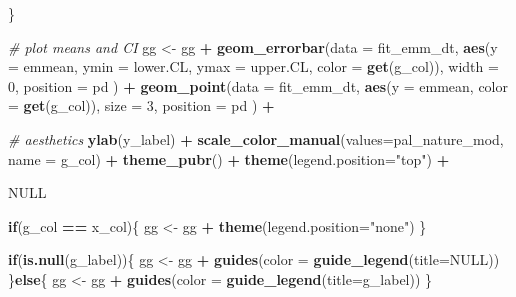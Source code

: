 \documentclass[]{book}
\newenvironment{Shaded}{\begin{snugshade}}{\end{snugshade}}
\newcommand{\CommentTok}[1]{\textcolor[rgb]{0.56,0.35,0.01}{\textit{#1}}}
\newcommand{\ControlFlowTok}[1]{\textcolor[rgb]{0.13,0.29,0.53}{\textbf{#1}}}
\newcommand{\DataTypeTok}[1]{\textcolor[rgb]{0.13,0.29,0.53}{#1}}
\newcommand{\DecValTok}[1]{\textcolor[rgb]{0.00,0.00,0.81}{#1}}
\newcommand{\KeywordTok}[1]{\textcolor[rgb]{0.13,0.29,0.53}{\textbf{#1}}}
\newcommand{\NormalTok}[1]{#1}
\newcommand{\OperatorTok}[1]{\textcolor[rgb]{0.81,0.36,0.00}{\textbf{#1}}}
\newcommand{\OtherTok}[1]{\textcolor[rgb]{0.56,0.35,0.01}{#1}}
\newcommand{\StringTok}[1]{\textcolor[rgb]{0.31,0.60,0.02}{#1}}
\begin{document}
\begin{Shaded}
\begin{Highlighting}[]
\NormalTok{  \}}

  \CommentTok{# plot means and CI}
\NormalTok{  gg <-}\StringTok{ }\NormalTok{gg }\OperatorTok{+}
\StringTok{    }\KeywordTok{geom_errorbar}\NormalTok{(}\DataTypeTok{data =}\NormalTok{ fit_emm_dt, }\KeywordTok{aes}\NormalTok{(}\DataTypeTok{y =}\NormalTok{ emmean,}
                                           \DataTypeTok{ymin =}\NormalTok{ lower.CL,}
                                           \DataTypeTok{ymax =}\NormalTok{ upper.CL,}
                                        \DataTypeTok{color =} \KeywordTok{get}\NormalTok{(g_col)),}
               \DataTypeTok{width =} \DecValTok{0}\NormalTok{,}
              \DataTypeTok{position =}\NormalTok{ pd}
\NormalTok{    ) }\OperatorTok{+}
\StringTok{    }\KeywordTok{geom_point}\NormalTok{(}\DataTypeTok{data =}\NormalTok{ fit_emm_dt, }\KeywordTok{aes}\NormalTok{(}\DataTypeTok{y =}\NormalTok{ emmean,}
                                        \DataTypeTok{color =} \KeywordTok{get}\NormalTok{(g_col)),}
               \DataTypeTok{size =} \DecValTok{3}\NormalTok{,}
              \DataTypeTok{position =}\NormalTok{ pd}
\NormalTok{    ) }\OperatorTok{+}

\StringTok{    }\CommentTok{# aesthetics}
\StringTok{    }\KeywordTok{ylab}\NormalTok{(y_label) }\OperatorTok{+}
\StringTok{    }\KeywordTok{scale_color_manual}\NormalTok{(}\DataTypeTok{values=}\NormalTok{pal_nature_mod,}
                       \DataTypeTok{name =}\NormalTok{ g_col) }\OperatorTok{+}
\StringTok{    }\KeywordTok{theme_pubr}\NormalTok{() }\OperatorTok{+}
\StringTok{    }\KeywordTok{theme}\NormalTok{(}\DataTypeTok{legend.position=}\StringTok{"top"}\NormalTok{) }\OperatorTok{+}

\StringTok{    }\OtherTok{NULL}
  
  
  \ControlFlowTok{if}\NormalTok{(g_col }\OperatorTok{==}\StringTok{ }\NormalTok{x_col)\{}
\NormalTok{    gg <-}\StringTok{ }\NormalTok{gg }\OperatorTok{+}\StringTok{ }\KeywordTok{theme}\NormalTok{(}\DataTypeTok{legend.position=}\StringTok{"none"}\NormalTok{)}
\NormalTok{  \}}
  
  \ControlFlowTok{if}\NormalTok{(}\KeywordTok{is.null}\NormalTok{(g_label))\{}
\NormalTok{    gg <-}\StringTok{ }\NormalTok{gg }\OperatorTok{+}\StringTok{ }\KeywordTok{guides}\NormalTok{(}\DataTypeTok{color =} \KeywordTok{guide_legend}\NormalTok{(}\DataTypeTok{title=}\OtherTok{NULL}\NormalTok{))}
\NormalTok{  \}}\ControlFlowTok{else}\NormalTok{\{}
\NormalTok{    gg <-}\StringTok{ }\NormalTok{gg }\OperatorTok{+}\StringTok{ }\KeywordTok{guides}\NormalTok{(}\DataTypeTok{color =} \KeywordTok{guide_legend}\NormalTok{(}\DataTypeTok{title=}\NormalTok{g_label))}
\NormalTok{  \}}


\end{Highlighting}
\end{Shaded}
\end{document}
